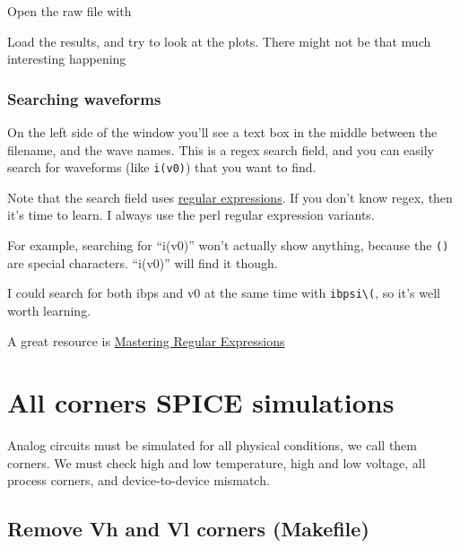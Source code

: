 Open the raw file with

\begin{Shaded}
\begin{Highlighting}[]
\end{Highlighting}
\end{Shaded}

Load the results, and try to look at the plots. There might not be that
much interesting happening

\subsubsection{Searching waveforms}\label{searching-waveforms}

On the left side of the window you'll see a text box in the middle
between the filename, and the wave names. This is a regex search field,
and you can easily search for waveforms (like \texttt{i(v0)}) that you
want to find.

Note that the search field uses
\href{https://en.wikipedia.org/wiki/Regular_expression}{regular
expressions}. If you don't know regex, then it's time to learn. I always
use the perl regular expression variants.

For example, searching for ``i(v0)'' won't actually show anything,
because the \texttt{()} are special characters. ``i(v0)'' will find it
though.

I could search for both ibps and v0 at the same time with
\texttt{ibps\textbar{}i\textbackslash{}(}, so it's well worth learning.

A great resource is \href{https://regex.info/book.html}{Mastering
Regular Expressions}

\section{\texorpdfstring{All corners SPICE simulations
}{All corners SPICE simulations }}\label{all-corners-spice-simulations}

Analog circuits must be simulated for all physical conditions, we call
them corners. We must check high and low temperature, high and low
voltage, all process corners, and device-to-device mismatch.

\subsection{Remove Vh and Vl corners
(Makefile)}\label{remove-vh-and-vl-corners-makefile}

